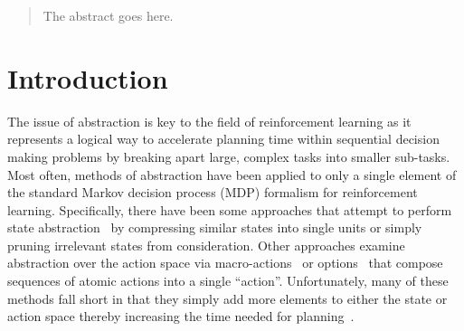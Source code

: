 \documentclass[conference]{IEEEtran}
\begin{document}
\begin{abstract}
The abstract goes here.
\end{abstract}

\IEEEpeerreviewmaketitle

\section{Introduction}
The issue of abstraction is key to the field of reinforcement learning as it represents a logical way to accelerate planning time within sequential decision making problems by breaking apart large, complex tasks into smaller sub-tasks. Most often, methods of abstraction have been applied to only a single element of the standard Markov decision process (MDP) formalism for reinforcement learning. Specifically, there have been some approaches that attempt to perform state abstraction~\cite{Li2006TowardsAU} by compressing similar states into single units or simply pruning irrelevant states from consideration. Other approaches examine abstraction over the action space via macro-actions~\cite{Hauskrecht1998HierarchicalSO} or options~\cite{Sutton1999BetweenMA} that compose sequences of atomic actions into a single ``action''. Unfortunately, many of these methods fall short in that they simply add more elements to either the state or action space thereby increasing the time needed for planning~\cite{Jong2008TheUO}.
\end{document}
